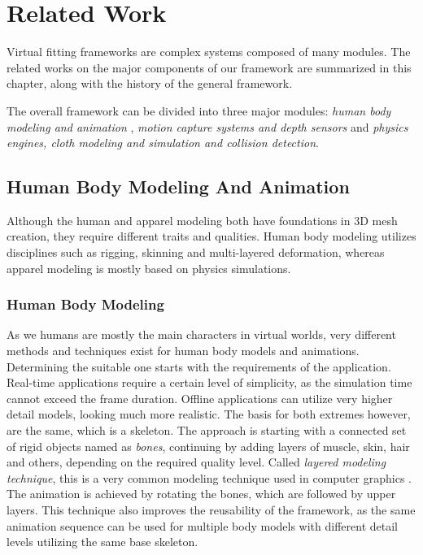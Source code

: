 \chapter{Related Work}
\label{chapter_related_work}

Virtual fitting frameworks are complex systems composed of many modules. The related works on the major components of our framework are summarized in this chapter, 
along with the history of the general framework. 

The overall framework can be divided into three major modules: \textit{human body modeling and animation} , \textit{motion capture systems and depth sensors} and 
\textit{physics engines, cloth modeling and simulation and collision detection}. 

\section{Human Body Modeling And Animation}
\label{section_related_modeling}

Although the human and apparel modeling both have foundations in 3D mesh creation, they require different traits and qualities. Human body modeling utilizes disciplines such as rigging, 
skinning and multi-layered deformation, whereas apparel modeling is mostly based on physics simulations.

\subsection{Human Body Modeling}
As we humans are mostly the main characters in virtual worlds, very different methods and techniques exist for human body models and animations. Determining the suitable one 
starts with the requirements of the application. Real-time applications require a certain level of simplicity, as the simulation time cannot exceed the frame duration. Offline 
applications can utilize very higher detail models, looking much more realistic. The basis for both extremes however, are the same, which is a skeleton. The approach is starting 
with a connected set of rigid objects named as \textit{bones}, continuing by adding layers of muscle, skin, hair and others, depending on the required quality level. Called \textit{layered
modeling technique}, this is a very common modeling technique used in computer graphics \cite{Chadwick1989}. The animation is achieved by rotating the bones, which are followed by 
upper layers. This technique also improves the reusability of the framework, as the same animation sequence can be used for multiple body models with different detail levels utilizing the 
same base skeleton.   

